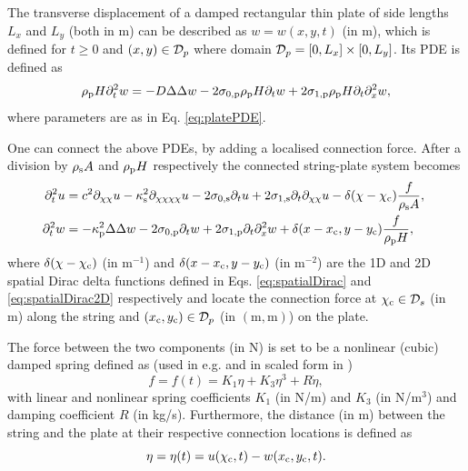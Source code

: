 The transverse displacement of a damped rectangular thin plate of side lengths $L_x$ and $L_y$ (both in m) can be described as $w=w(x,y,t)$ (in m), which is defined for $t\geq 0$ and $(x,y)\in \mathcal{D}_p$ where domain $\mathcal{D}_p = [0, L_x] \times [0, L_y]$. Its PDE is defined as
\begin{equation}
    \rho_\ptxt H\ptt w = -D\Delta\Delta w - 2\szX[\ptxt]\rho_\ptxt H\pt w + 2\soX[\ptxt] \rho_\ptxt H\pt\pxx w,
\end{equation}
where parameters are as in Eq. \eqref{eq:platePDE}.

One can connect the above PDEs, by adding a localised connection force. After a division by $\rho_{\text{s}} A$ and $\rho_{\text{p}} H$ respectively the connected string-plate system becomes
\begin{subequations}\label{eq:connStringPlatePDEs}
    \begin{align}
        \!\!\ptt u &= c^2 \partial_{\chi\chi} u - \kappa_\stxt^2 \partial_{\chi\chi\chi\chi} u - 2\szX[\stxt]\pt u + 2\soX[\stxt] \pt\partial_{\chi\chi} u - \delta(\chi-\chi_\ctxt)\frac{f}{\rho_\stxt A},\\
    \!\!\ptt w &= -\kappa_\ptxt^2\Delta\Delta w - 2\szX[\ptxt]\pt w + 2\soX[\ptxt] \pt\pxx w + \delta(x-x_\ctxt, y-y_\ctxt)\frac{f}{ \rho_\ptxt H},
    \end{align}
\end{subequations}
where $\delta(\chi-\chi_{\text{c}})$ (in m$^{-1}$) and $\delta(x-x_{\text{c}}, y-y_{\text{c}})$ (in m$^{-2}$) are the 1D and 2D spatial Dirac delta functions defined in Eqs. \eqref{eq:spatialDirac} and \eqref{eq:spatialDirac2D} respectively and locate the connection force at $\chi_{\text{c}} \in \mathcal{D}_s$ (in m) along the string and $(x_{\text{c}},y_{\text{c}})\in \mathcal{D}_p$ (in $(\text{m}, \text{m})$) on the plate.

The force between the two components (in N) is set to be a nonlinear (cubic) damped spring defined as (used in e.g. \cite{Webb2015} and in scaled form in \cite{Bilbao2009Modular})
\begin{equation}\label{eq:nonlinearForce}
    f = f(t) = K_1\eta+K_3\eta^3+R \dot\eta,
\end{equation}
with linear and nonlinear spring coefficients $K_1$ (in N/m) and $K_3$ (in N/m$^3$) and damping coefficient $R$ (in kg/s). Furthermore, the distance (in m) between the string and the plate at their respective connection locations is defined as
\begin{equation}
    \eta = \eta(t) = u(\chi_{\text{c}}, t) - w(x_{\text{c}}, y_{\text{c}}, t).
\end{equation}


